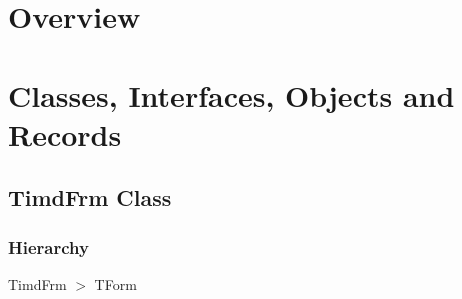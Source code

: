 \documentclass{report}
\newif\ifpdf
\begin{document}
\section{Overview}
\begin{description}
\item[\texttt{\begin{ttfamily}TimdFrm\end{ttfamily} Class}]
\end{description}
\section{Classes, Interfaces, Objects and Records}
\ifpdf
\subsection*{\large{\textbf{TimdFrm Class}}\normalsize\hspace{1ex}\hrulefill}
\else
\subsection*{TimdFrm Class}
\fi
\label{xtypefm.TimdFrm}
\subsubsection*{\large{\textbf{Hierarchy}}\normalsize\hspace{1ex}\hfill}
TimdFrm {$>$} TForm
\end{document}
